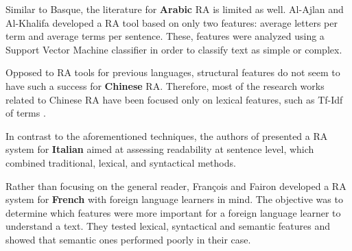 \documentclass[12pt]{article}
\begin{document}
Similar to Basque, the literature for \textbf{Arabic} RA is limited as well. Al-Ajlan and Al-Khalifa \cite{al2008towards} developed a RA tool based on only two features: average letters per term and average terms per sentence. These, features were analyzed using a Support Vector Machine classifier in order to classify text as simple or complex.

Opposed to RA tools for previous languages, structural features do not seem to have such a success for \textbf{Chinese} RA. Therefore, most of the research works  related to Chinese RA have been focused only on lexical features, such as Tf-Idf of terms \cite{chen2011chinese,collins2004language}.



In contrast to the aforementioned techniques, the authors of \cite{dell2011read}   presented a RA system for \textbf{Italian} aimed at assessing readability at sentence level, which combined traditional, lexical, and syntactical methods.%



Rather than focusing on the general reader,  Fran{\c{c}}ois and Fairon \cite{franccois2012ai} developed a RA system for \textbf{French} with foreign language learners in mind. The objective was to determine which features were more important for a foreign language learner to understand a text. They tested lexical, syntactical and semantic features and showed that semantic ones performed poorly in their case.
\end{document}
